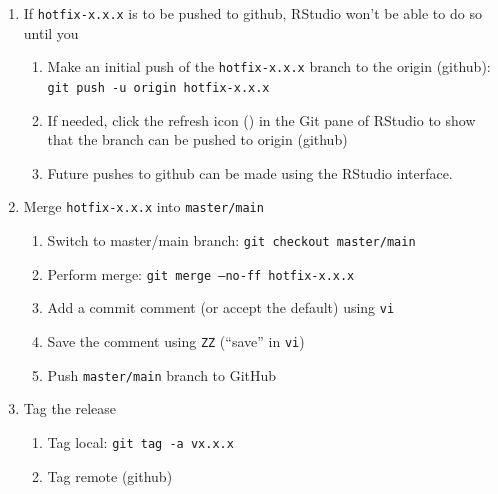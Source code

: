 \documentclass{article}
\begin{document}
\begin{enumerate}
  \item If \texttt{hotfix-x.x.x} is to be pushed to github, RStudio won't be able to do so until you
  \begin{enumerate}

    \item Make an initial push of the \texttt{hotfix-x.x.x} branch
  	      to the origin (github):
  		  \texttt{git push -u origin hotfix-x.x.x} 
		  
	\item If needed, click the refresh icon 
  		  () in the Git pane of RStudio to 
  		  show that the branch can be pushed to origin (github)

  	\item Future pushes to github can be made using the RStudio interface.

  \end{enumerate}
  \item Merge \texttt{hotfix-x.x.x} into \texttt{master/main}  
  \begin{enumerate}

    \item Switch to master/main branch: \texttt{git checkout master/main} 
	
    \item Perform merge: \texttt{git merge --no-ff hotfix-x.x.x} 
	
	\item Add a commit comment (or accept the default) using \texttt{vi} 
	
	\item Save the comment using \texttt{ZZ} (``save'' in \texttt{vi})
	
	\item Push \texttt{master/main} branch to GitHub 

  \end{enumerate}
  \item Tag the release
  \begin{enumerate}

    \item Tag local: \texttt{git tag -a vx.x.x}

    \item Tag remote (github)
	\begin{enumerate}


\end{enumerate}
\end{enumerate}
\end{enumerate}
\end{document}
